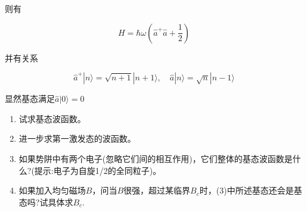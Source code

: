 则有

\[
H = \hbar \omega \left( \hat{a}^+ \hat{a} + \frac{1}{2} \right)~
\]

并有关系

\[
\hat{a}^+ |n\rangle = \sqrt{n+1} |n+1\rangle, \quad
\hat{a} |n\rangle = \sqrt{n} |n-1\rangle~
\]

显然基态满足$\hat{a} |0\rangle = 0$

\begin{enumerate}
    \item 试求基态波函数。
    \item 进一步求第一激发态的波函数。
    \item 如果势阱中有两个电子(忽略它们间的相互作用)，它们整体的基态波函数是什么?(提示:电子为自旋1/2的全同粒子)。
    \item 如果加入均匀磁场$B$，问当$B$很强，超过某临界$B_c$时，(3)中所述基态还会是基态吗?试具体求$B_c$.
\end{enumerate}